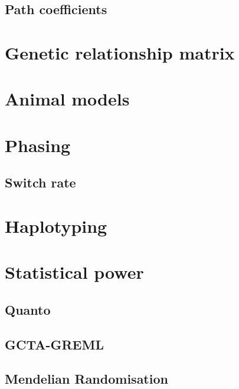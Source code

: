 \documentclass[
]{book}
\begin{document}
\hypertarget{path-coefficients}{%
\subsection{Path coefficients}\label{path-coefficients}}

\hypertarget{genetic-relationship-matrix}{%
\section{Genetic relationship matrix}\label{genetic-relationship-matrix}}

\hypertarget{animal-models}{%
\section{Animal models}\label{animal-models}}

\hypertarget{phasing}{%
\section{Phasing}\label{phasing}}

\hypertarget{switch-rate}{%
\subsection{Switch rate}\label{switch-rate}}

\hypertarget{haplotyping}{%
\section{Haplotyping}\label{haplotyping}}

\hypertarget{statistical-power}{%
\section{Statistical power}\label{statistical-power}}

\hypertarget{quanto}{%
\subsection{Quanto}\label{quanto}}

\hypertarget{gcta-greml}{%
\subsection{GCTA-GREML}\label{gcta-greml}}

\hypertarget{mendelian-randomisation}{%
\subsection{Mendelian Randomisation}\label{mendelian-randomisation}}
\end{document}
